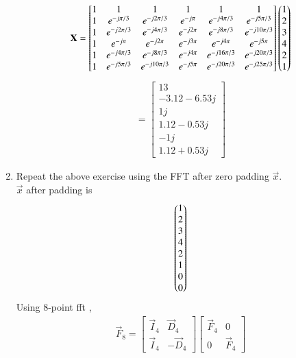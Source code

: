 \documentclass[journal,12pt,twocolumn]{IEEEtran}
\renewcommand\thesection{\arabic{section}}
\begin{document}
\begin{enumerate}[label=\arabic*.,ref=\thesection.\theenumi]
	\begin{align}
		\mathbf{X}=\begin{bmatrix}
			1&1&1&1&1&1\\1&e^{-j \pi/3 }&e^{-j 2 \pi/3 }&e^{-j \pi }&e^{-j 4 \pi/3 }&e^{-j 5 \pi/3 }\\1&e^{-j 2 \pi/3 }&e^{-j 4 \pi/3 }&e^{-j 2 \pi }&e^{-j 8\pi/3 }&e^{-j 10 \pi/3 }\\1&e^{-j \pi }&e^{-j 2 \pi }&e^{-j 3 \pi }&e^{-j 4 \pi }&e^{-j 5 \pi }\\1&e^{-j 4 \pi/3 }&e^{-j 8 \pi/3 }&e^{-j 4 \pi }&e^{-j 16 \pi/3 }&e^{-j 20 \pi/3 }\\1&e^{-j 5 \pi/3 }&e^{-j 10 \pi/3 }&e^{-j 5 \pi }&e^{-j 20 \pi/3 }&e^{-j 25 \pi/3 }
		\end{bmatrix} \begin{pmatrix}1\\2\\3\\4\\2\\1\end{pmatrix}
	\end{align}
	\begin{align}
		=\begin{bmatrix}
			13\\-3.12-6.53j\\1j\\1.12-0.53j\\-1j\\1.12+0.53j
		\end{bmatrix}
	\end{align}
	\item Repeat the above exercise using the FFT
	after zero padding $\vec{x}$.\\
	\solution $\vec{x}$ after padding is 
	\begin{align}
		\begin{pmatrix}1\\2\\3\\4\\2\\1\\0\\0\end{pmatrix}
	\end{align}
	Using 8-point fft ,
	\begin{align}
		\vec{F}_{8}=
		\begin{bmatrix}
			\vec{I}_{4} & \vec{D}_{4} \\
			\vec{I}_{4} & -\vec{D}_{4}
		\end{bmatrix}
		\begin{bmatrix}
			\vec{F}_{4} & 0 \\
			0 & \vec{F}_{4}

\end{bmatrix}
\end{align}
\end{enumerate}
\end{document}
